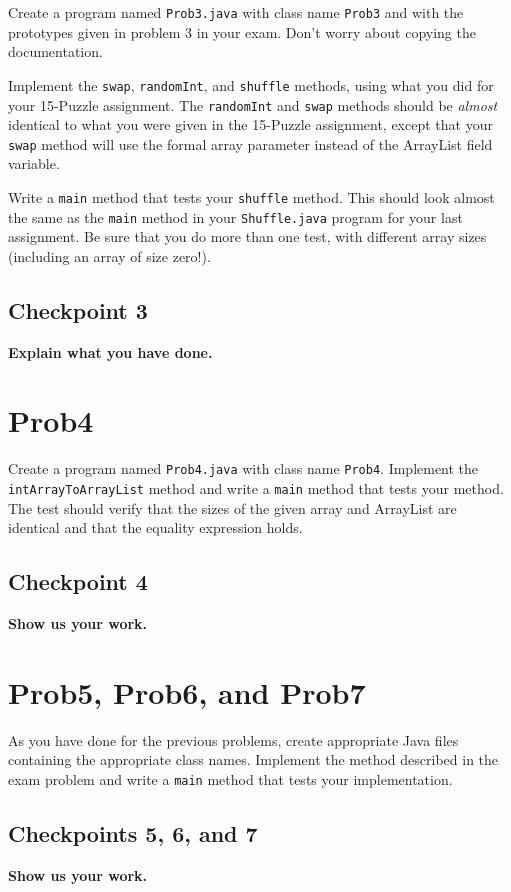 \documentclass[12pt]{article}
\begin{document}
Create a program named \verb'Prob3.java'
with class name \verb'Prob3'
and with the prototypes given in problem 3 in your exam.
Don't worry about copying the documentation.

Implement the \verb'swap', \verb'randomInt', and \verb'shuffle' methods,
using what you did for your 15-Puzzle assignment.
The \verb'randomInt' and \verb'swap' methods
should be {\em almost} identical to what you were given
in the 15-Puzzle assignment, except that your \verb'swap' method
will use the formal array parameter
instead of the ArrayList field variable.

Write a \verb'main' method that tests your \verb'shuffle' method.
This should look almost the same as the \verb'main' method
in your \verb'Shuffle.java' program for your last assignment.
Be sure that you do more than one test,
with different array sizes (including an array of size zero!).

\subsection*{Checkpoint 3}
{\bf
Explain what you have done.
}

\section*{Prob4}

Create a program named \verb'Prob4.java'
with class name \verb'Prob4'.
Implement the \verb'intArrayToArrayList' method
and write a \verb'main' method
that tests your method.
The test should verify that the sizes of the given array
and ArrayList are identical
and that the equality expression holds.

\subsection*{Checkpoint 4}
{\bf
Show us your work.
}

\section*{Prob5, Prob6, and Prob7}

As you have done for the previous problems,
create appropriate Java files containing the appropriate class names.
Implement the method described in the exam problem
and write a \verb'main' method that tests your implementation.

\subsection*{Checkpoints 5, 6, and 7}
{\bf
Show us your work.
}
\end{document}
